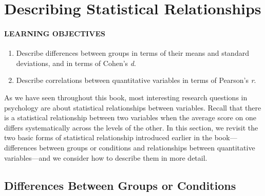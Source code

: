 \documentclass[
]{krantz}
\providecommand{\tightlist}{%
  \setlength{\itemsep}{0pt}\setlength{\parskip}{0pt}}
\begin{document}
\hypertarget{describing-statistical-relationships}{%
\section{Describing Statistical Relationships}\label{describing-statistical-relationships}}

\hypertarget{learning-objectives-36}{%
\paragraph*{LEARNING OBJECTIVES}\label{learning-objectives-36}}

\begin{enumerate}
\def\labelenumi{\arabic{enumi}.}
\tightlist
\item
  Describe differences between groups in terms of their means and standard deviations, and in terms of Cohen's \emph{d}.
\item
  Describe correlations between quantitative variables in terms of Pearson's \emph{r}.
\end{enumerate}

As we have seen throughout this book, most interesting research questions in psychology are about statistical relationships between variables. Recall that there is a statistical relationship between two variables when the average score on one differs systematically across the levels of the other. In this section, we revisit the two basic forms of statistical relationship introduced earlier in the book---differences between groups or conditions and relationships between quantitative variables---and we consider how to describe them in more detail.

\hypertarget{differences-between-groups-or-conditions}{%
\subsection*{Differences Between Groups or Conditions}\label{differences-between-groups-or-conditions}}
\end{document}
